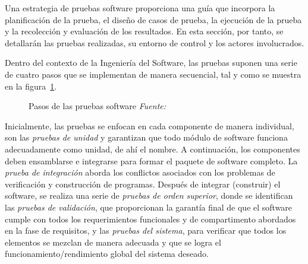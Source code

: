 Una estrategia de pruebas software proporciona una guía que incorpora la planificación de la prueba, el diseño de casos de prueba, la ejecución de la prueba y la recolección y evaluación de los resultados. En esta sección, por tanto, se detallarán las pruebas realizadas, su entorno de control y los actores involucrados.

Dentro del contexto de la Ingeniería del Software, las pruebas suponen una serie de cuatro pasos que se implementan de manera secuencial, tal y como se muestra en la figura~\ref{fig:estrategiaPruebas}. 

\begin{figure}
	\centering
	\caption{Pasos de las pruebas software \textit{Fuente:~\cite{Pre10}}}
	\label{fig:estrategiaPruebas}
\end{figure}

Inicialmente, las pruebas se enfocan en cada componente de manera individual, son las \emph{pruebas de unidad} y garantizan que todo módulo de software funciona adecuadamente como unidad, de ahí el nombre. A continuación, los componentes deben ensamblarse e integrarse para formar el paquete de software completo. La \emph{prueba de integración} aborda los conflictos asociados con los problemas de verificación y construcción de programas. Después de integrar (construir) el software, se realiza una serie de \emph{pruebas de orden superior}, donde se identifican las \emph{pruebas de validación}, que proporcionan la garantía final de que el software cumple con todos los requerimientos funcionales y de compartimento abordados en la fase de requisitos, y las \emph{pruebas del sistema}, para verificar que todos los elementos se mezclan de manera adecuada y que se logra el funcionamiento/rendimiento global del sistema deseado.

